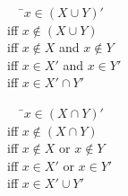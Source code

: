 \documentclass[../notes.tex]{subfiles}
\begin{document}
			\begin{examplebox}
				\begin{tabbing}
					$\quad$ \=$x \in (X \cup Y)'$\\
					iff \>$x \notin (X \cup Y)$\\
					iff \>$x \notin X$ and $x \notin Y$\\
					iff \>$x \in X'$ and $x \in Y'$\\
					iff \>$x \in X' \cap Y'$
				\end{tabbing}
				\begin{tabbing}
					$\quad$ \=$x \in (X \cap Y)'$\\
					iff \> $x \notin (X \cap Y)$\\
					iff \> $x \notin X$ or $x \notin Y$\\
					iff \> $x \in X'$ or $x \in Y'$\\
					iff \> $x \in X' \cup Y'$
				\end{tabbing}
			\end{examplebox}
			\pagebreak
\end{document}
